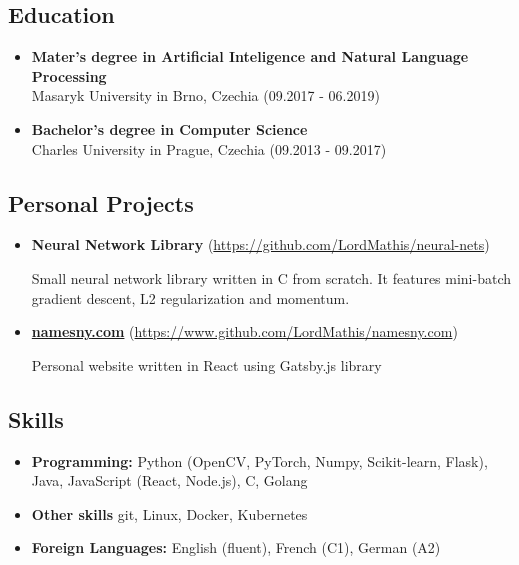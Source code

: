 \documentclass[a4,12pt]{article}
\providecommand{\tightlist}{%
  \setlength{\itemsep}{0pt}\setlength{\parskip}{0pt}}
\begin{document}
\subsection*{Education}\label{education}

\begin{itemize}
\item
  \textbf{Mater's degree in Artificial Inteligence and Natural Language Processing}\\
  Masaryk University in Brno, Czechia \hfill (09.2017 - 06.2019)
\item
  \textbf{Bachelor's degree in Computer Science}\\
  Charles University in Prague, Czechia \hfill (09.2013 - 09.2017)
\end{itemize}

\subsection*{Personal Projects}\label{projects}

\begin{itemize}

\item
    \textbf{Neural Network Library} (\href{https://github.com/LordMathis/neural-nets}{https://github.com/LordMathis/neural-nets})

    Small neural network library written in C from scratch. It features mini-batch gradient descent, L2 regularization and momentum.

\item
  \textbf{\href{https://namesny.com}{namesny.com}} (\href{https://www.github.com/LordMathis/namesny.com}{https://www.github.com/LordMathis/namesny.com})

  Personal website written in React using Gatsby.js library
  

\end{itemize}

\subsection*{Skills}\label{skills}

\begin{itemize}
\tightlist
\item
  \textbf{Programming:} Python (OpenCV, PyTorch, Numpy, Scikit-learn, Flask), Java, JavaScript (React, Node.js), C, Golang
\item
  \textbf{Other skills} git, Linux, Docker, Kubernetes
\item
  \textbf{Foreign Languages:} English (fluent), French (C1), German (A2)
\end{itemize}
\end{document}
